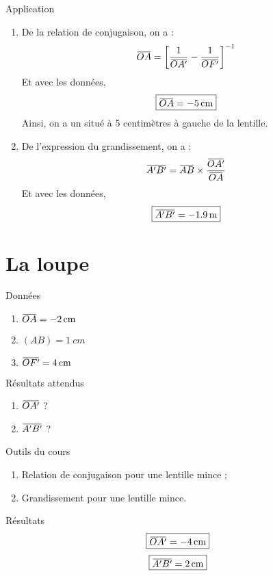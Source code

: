 \documentclass[10pt,a5paper,notitlepage]{book}
\begin{document}
\begin{NCexem}{Application}
    \begin{enumerate}
        \item De la relation de conjugaison, on a :
            \[\OA = \left[ \frac{1}{\OAp} - \frac{1}{\OF} \right]^{-1}\]
            Et avec les données,
            \[ \boxed{\OA = \SI{- 5}{cm}}\]
            Ainsi, on a un  situé à 5 centimètres à gauche de
            la lentille.

        \item De l'expression du grandissement, on a :
            \[\ABp = \ABb\times\frac{\OAp}{\OA}\]
            Et avec les données,
            \[ \boxed{\ABp = \SI{- 1.9}{m}} \]
    \end{enumerate}
\end{NCexem}

\section{La loupe}
\begin{NCdefi}{Données}
    \begin{enumerate}
        \item $\OA = \SI{-2}{cm}$
        \item $(AB) = \SI{1}{cm}$
        \item $\OF = \SI{4}{cm}$
    \end{enumerate}
\end{NCdefi}

\begin{NCprop}{Résultats attendus}
    \begin{enumerate}
        \item $\OAp$ ?
        \item $\ABp$ ?
    \end{enumerate}
\end{NCprop}

\begin{NCdemo}{Outils du cours}
   \begin{enumerate}
       \item Relation de conjugaison pour une lentille mince ;
       \item Grandissement pour une lentille mince.
   \end{enumerate} 
\end{NCdemo}

\begin{NCexem}{Résultats}
    \[ \boxed{\OAp = \SI{-4}{cm}} \]
    \[ \boxed{\ABp = \SI{2}{cm}} \]
\end{NCexem}
\end{document}
